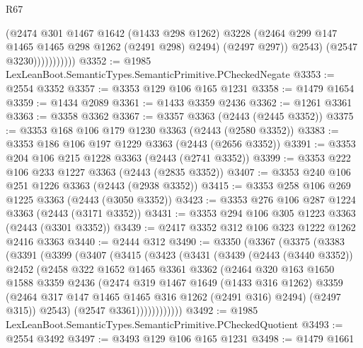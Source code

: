 \begin{lexlean}{R67}
\begin{coremodule}
                          (@2474
                            @301
                            @1467
                            @1642
                            (@1433 @298 @1262)
                            @3228
                            (@2464 @299 @147 @1465 @1465 @298 @1262 (@2491 @298) @2494)
                            (@2497 @297))
                          @2543)
                        (@2547 @3230)))))))))))
@3352 := @1985 LexLeanBoot.SemanticTypes.SemanticPrimitive.PCheckedNegate
@3353 := @2554 @3352
@3357 := @3353 @129 @106 @165 @1231
@3358 := @1479 @1654
@3359 := @1434 @2089
@3361 := @1433 @3359 @2436
@3362 := @1261 @3361
@3363 := @3358 @3362
@3367 := @3357 @3363 (@2443 (@2445 @3352))
@3375 := @3353 @168 @106 @179 @1230 @3363 (@2443 (@2580 @3352))
@3383 := @3353 @186 @106 @197 @1229 @3363 (@2443 (@2656 @3352))
@3391 := @3353 @204 @106 @215 @1228 @3363 (@2443 (@2741 @3352))
@3399 := @3353 @222 @106 @233 @1227 @3363 (@2443 (@2835 @3352))
@3407 := @3353 @240 @106 @251 @1226 @3363 (@2443 (@2938 @3352))
@3415 := @3353 @258 @106 @269 @1225 @3363 (@2443 (@3050 @3352))
@3423 := @3353 @276 @106 @287 @1224 @3363 (@2443 (@3171 @3352))
@3431 := @3353 @294 @106 @305 @1223 @3363 (@2443 (@3301 @3352))
@3439 := @2417 @3352 @312 @106 @323 @1222 @1262 @2416 @3363
@3440 := @2444 @312
@3490 := @3350
    (@3367
      (@3375
        (@3383
          (@3391
            (@3399
              (@3407
                (@3415
                  (@3423
                    (@3431
                      (@3439
                        (@2443 (@3440 @3352))
                        @2452
                        (@2458
                          @322
                          @1652
                          @1465
                          @3361
                          @3362
                          (@2464
                            @320
                            @163
                            @1650
                            @1588
                            @3359
                            @2436
                            (@2474
                              @319
                              @1467
                              @1649
                              (@1433 @316 @1262)
                              @3359
                              (@2464 @317 @147 @1465 @1465 @316 @1262 (@2491 @316) @2494)
                              (@2497 @315))
                            @2543)
                          (@2547 @3361))))))))))))
@3492 := @1985 LexLeanBoot.SemanticTypes.SemanticPrimitive.PCheckedQuotient
@3493 := @2554 @3492
@3497 := @3493 @129 @106 @165 @1231
@3498 := @1479 @1661

\end{coremodule}
\end{lexlean}
